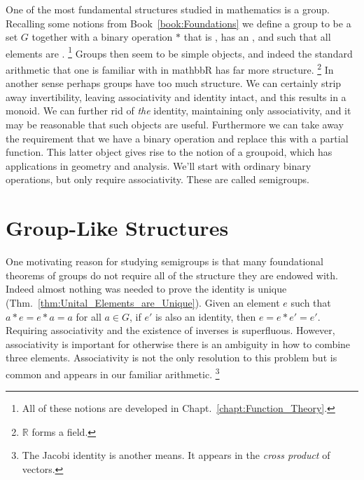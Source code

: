 One of the most fundamental structures studied in mathematics is a
\gls{group}. Recalling some notions from
Book~\ref{book:Foundations} we define a group to be a \gls{set} $G$
together with a \gls{binary operation} $*$ that is
%
, has an %
, and such that all elements are
.%
\footnote{%
    All of these notions are developed in Chapt.~\ref{chapt:Function_Theory}.
}
Groups then seem to be simple objects, and indeed the standard arithmetic that
one is familiar with in \gls{mathbbR} has far more structure.%
\footnote{%
    $\mathbb{R}$ forms a \gls{field}.
}
In another sense perhaps groups have too much
structure. We can certainly strip away invertibility, leaving associativity and
identity intact, and this results in a \gls{monoid}. We can
further rid of \textit{the} identity, maintaining only associativity, and it
may be reasonable that such objects are useful. Furthermore we can take away the
requirement that we have a binary operation and replace this with a partial
function. This latter object gives rise to the notion of
a groupoid, which
has applications in geometry and analysis. We'll start with ordinary
binary operations, but only require associativity. These are called
\glspl{semigroup}.
\section{Group-Like Structures}
    One motivating reason for studying semigroups is that many foundational
    theorems of groups do not require all of the structure they are endowed
    with. Indeed almost nothing was needed to prove the identity is unique
    (Thm.~\ref{thm:Unital_Elements_are_Unique}). Given an element $e$ such that
    $a*e=e*a=a$ for all $a\in{G}$, if $e'$ is also an identity, then
    $e=e*e'=e'$. Requiring associativity and the existence of inverses is
    superfluous. However, associativity is important for otherwise there is an
    ambiguity in how to combine three elements. Associativity is not the only
    resolution to this problem but is common and appears in our familiar
    arithmetic.%
    \footnote{%
        The Jacobi identity is another means. It appears
        in the \textit{cross product} of vectors.
    }
